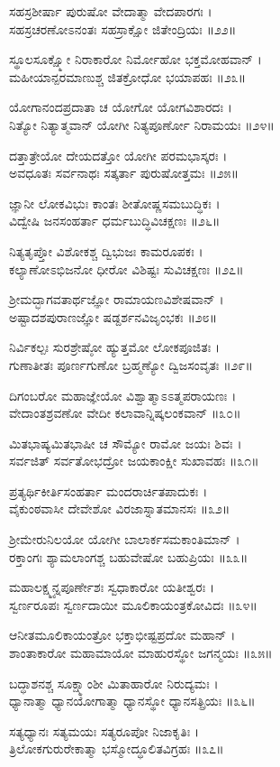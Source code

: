 ಸಹಸ್ರಶೀರ್ಷಾ ಪುರುಷೋ ವೇದಾತ್ಮಾ ವೇದಪಾರಗಃ ।\\
ಸಹಸ್ರಚರಣೋಽನಂತಃ ಸಹಸ್ರಾಕ್ಷೋ ಜಿತೇಂದ್ರಿಯಃ ॥೨೨॥

ಸ್ಥೂಲಸೂಕ್ಷ್ಮೋ ನಿರಾಕಾರೋ ನಿರ್ಮೋಹೋ ಭಕ್ತಮೋಹವಾನ್ ।\\
ಮಹೀಯಾನ್ಪರಮಾಣುಶ್ಚ ಜಿತಕ್ರೋಧೋ ಭಯಾಪಹಃ ॥೨೩॥

ಯೋಗಾನಂದಪ್ರದಾತಾ ಚ ಯೋಗೋ ಯೋಗವಿಶಾರದಃ ।\\
ನಿತ್ಯೋ ನಿತ್ಯಾತ್ಮವಾನ್ ಯೋಗೀ ನಿತ್ಯಪೂರ್ಣೋ ನಿರಾಮಯಃ ॥೨೪॥

ದತ್ತಾತ್ರೇಯೋ ದೇಯದತ್ತೋ ಯೋಗೀ ಪರಮಭಾಸ್ಕರಃ ।\\
ಅವಧೂತಃ ಸರ್ವನಾಥಃ ಸತ್ಕರ್ತಾ ಪುರುಷೋತ್ತಮಃ ॥೨೫॥

ಜ್ಞಾನೀ ಲೋಕವಿಭುಃ ಕಾಂತಃ ಶೀತೋಷ್ಣಸಮಬುದ್ಧಿಕಃ ।\\
ವಿದ್ವೇಷಿ ಜನಸಂಹರ್ತಾ ಧರ್ಮಬುದ್ಧಿವಿಚಕ್ಷಣಃ ॥೨೬॥

ನಿತ್ಯತೃಪ್ತೋ ವಿಶೋಕಶ್ಚ ದ್ವಿಭುಜಃ ಕಾಮರೂಪಕಃ ।\\
ಕಲ್ಯಾಣೋಽಭಿಜನೋ ಧೀರೋ ವಿಶಿಷ್ಟಃ ಸುವಿಚಕ್ಷಣಃ ॥೨೭॥

ಶ್ರೀಮದ್ಭಾಗವತಾರ್ಥಜ್ಞೋ ರಾಮಾಯಣವಿಶೇಷವಾನ್ ।\\
ಅಷ್ಟಾದಶಪುರಾಣಜ್ಞೋ ಷಡ್ದರ್ಶನವಿಜೃಂಭಕಃ ॥೨೮॥

ನಿರ್ವಿಕಲ್ಪಃ ಸುರಶ್ರೇಷ್ಠೋ ಹ್ಯುತ್ತಮೋ ಲೋಕಪೂಜಿತಃ ।\\
ಗುಣಾತೀತಃ ಪೂರ್ಣಗುಣೋ ಬ್ರಹ್ಮಣ್ಯೋ ದ್ವಿಜಸಂವೃತಃ ॥೨೯॥

ದಿಗಂಬರೋ ಮಹಾಜ್ಞೇಯೋ ವಿಶ್ವಾತ್ಮಾಽಽತ್ಮಪರಾಯಣಃ ।\\
ವೇದಾಂತಶ್ರವಣೋ ವೇದೀ ಕಲಾವಾನ್ನಿಷ್ಕಲಂಕವಾನ್ ॥೩೦॥

ಮಿತಭಾಷ್ಯಮಿತಭಾಷೀ ಚ ಸೌಮ್ಯೋ ರಾಮೋ ಜಯಃ ಶಿವಃ ।\\
ಸರ್ವಜಿತ್ ಸರ್ವತೋಭದ್ರೋ ಜಯಕಾಂಕ್ಷೀ ಸುಖಾವಹಃ ॥೩೧॥

ಪ್ರತ್ಯರ್ಥಿಕೀರ್ತಿಸಂಹರ್ತಾ ಮಂದರಾರ್ಚಿತಪಾದುಕಃ ।\\
ವೈಕುಂಠವಾಸೀ ದೇವೇಶೋ ವಿರಜಾಸ್ನಾತಮಾನಸಃ ॥೩೨॥

ಶ್ರೀಮೇರುನಿಲಯೋ ಯೋಗೀ ಬಾಲಾರ್ಕಸಮಕಾಂತಿಮಾನ್ ।\\
ರಕ್ತಾಂಗಃ ಶ್ಯಾಮಲಾಂಗಶ್ಚ ಬಹುವೇಷೋ ಬಹುಪ್ರಿಯಃ ॥೩೩॥

ಮಹಾಲಕ್ಷ್ಮ್ಯನ್ನಪೂರ್ಣೇಶಃ ಸ್ವಧಾಕಾರೋ ಯತೀಶ್ವರಃ ।\\
ಸ್ವರ್ಣರೂಪಃ ಸ್ವರ್ಣದಾಯೀ ಮೂಲಿಕಾಯಂತ್ರಕೋವಿದಃ ॥೩೪॥

ಆನೀತಮೂಲಿಕಾಯಂತ್ರೋ ಭಕ್ತಾಭೀಷ್ಟಪ್ರದೋ ಮಹಾನ್ ।\\
ಶಾಂತಾಕಾರೋ ಮಹಾಮಾಯೋ ಮಾಹುರಸ್ಥೋ ಜಗನ್ಮಯಃ ॥೩೫॥

ಬದ್ಧಾಶನಶ್ಚ ಸೂಕ್ಷ್ಮಾಂಶೀ ಮಿತಾಹಾರೋ ನಿರುದ್ಯಮಃ ।\\
ಧ್ಯಾನಾತ್ಮಾ ಧ್ಯಾನಯೋಗಾತ್ಮಾ ಧ್ಯಾನಸ್ಥೋ ಧ್ಯಾನಸತ್ಪ್ರಿಯಃ ॥೩೬॥

ಸತ್ಯಧ್ಯಾನಃ ಸತ್ಯಮಯಃ ಸತ್ಯರೂಪೋ ನಿಜಾಕೃತಿಃ ।\\
ತ್ರಿಲೋಕಗುರುರೇಕಾತ್ಮಾ ಭಸ್ಮೋದ್ಧೂಲಿತವಿಗ್ರಹಃ ॥೩೭॥

